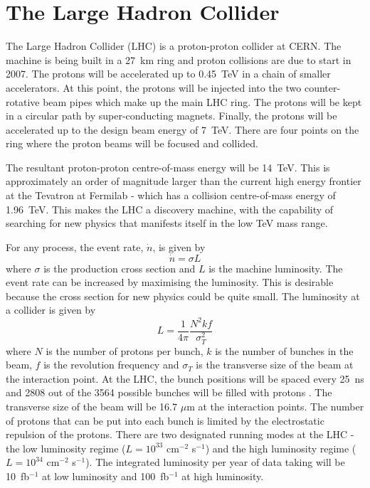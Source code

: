 \section{The Large Hadron Collider}\label{lhc}

The Large Hadron Collider (LHC) \cite{unknown:1995mi} is a proton-proton collider at CERN. The machine is being built in 
 a 27~km ring 
 and proton collisions are due to start in 2007. The protons will be accelerated up to 0.45~TeV in a chain of smaller accelerators. At this point, the protons will be injected into the two counter-rotative beam pipes which make up the main LHC ring. The protons will be kept in a circular path by super-conducting magnets. Finally, the protons will be accelerated up to the design beam energy of 7~TeV. There are four points on the ring where the proton beams will be focused and collided.

The resultant proton-proton centre-of-mass energy will be 14~TeV. This is approximately an order of magnitude larger than the current high energy frontier at the Tevatron at Fermilab - which has a collision centre-of-mass energy of 1.96~TeV. This makes the LHC a discovery machine, with the capability of searching for new physics that manifests itself in the low TeV mass range. 

For any process, the event rate, $\dot{n}$, is given by
\begin{equation} \label{eventrate}
\dot{n} = \sigma L
\end{equation}
where $\sigma$ is the production cross section and $L$ is the machine luminosity. The event rate can be increased by maximising the luminosity. This is desirable because the cross section for new physics could be quite small. The luminosity at a collider is given \cite{Vos:2000by} by
\begin{equation}
L = \frac{1}{4\pi}\frac{N^2 k f}{\sigma_T^2}
\end{equation}
where $N$ is the number of protons per bunch, $k$ is the number of bunches in the beam, $f$ is the revolution frequency and $\sigma_T$ is the transverse size of the beam at the interaction point.
At the LHC, the bunch positions will be spaced every 25~ns and 2808 out of the 3564 possible bunches will be filled with protons \cite{unknown:1995mi}. The transverse size of the beam will be 16.7 $\mu$m at the interaction points. The number of protons that can be put into each bunch is limited by the electrostatic repulsion of the protons. There are two designated running modes at the LHC - the low luminosity regime ($L=10^{33}$ cm$^{-2}$ s$^{-1}$) and the high luminosity regime ($L=10^{34}$ cm$^{-2}$ s$^{-1}$). The integrated luminosity per year of data taking will be 10~fb$^{-1}$ at low luminosity and 100~fb$^{-1}$ at high luminosity.

